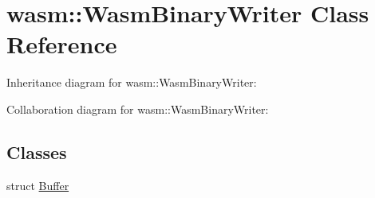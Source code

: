 \hypertarget{classwasm_1_1_wasm_binary_writer}{}\section{wasm\+:\+:Wasm\+Binary\+Writer Class Reference}
\label{classwasm_1_1_wasm_binary_writer}


Inheritance diagram for wasm\+:\+:Wasm\+Binary\+Writer\+:


Collaboration diagram for wasm\+:\+:Wasm\+Binary\+Writer\+:
\subsection*{Classes}
\begin{DoxyCompactItemize}
\item 
struct \mbox{\hyperlink{structwasm_1_1_wasm_binary_writer_1_1_buffer}{Buffer}}
\end{DoxyCompactItemize}
